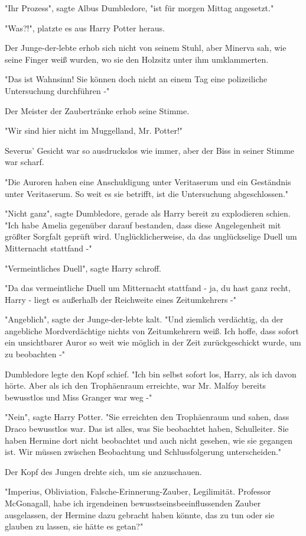{"Ihr Prozess", sagte Albus Dumbledore, "ist für morgen Mittag angesetzt."

"Was?!", platzte es aus Harry Potter heraus.

Der Junge-der-lebte erhob sich nicht von seinem Stuhl, aber Minerva sah, wie seine Finger weiß wurden, wo sie den Holzsitz unter ihm umklammerten.

"Das ist Wahnsinn! Sie können doch nicht an einem Tag eine polizeiliche Untersuchung durchführen -"

Der Meister der Zaubertränke erhob seine Stimme.

"Wir sind hier nicht im Muggelland, Mr. Potter!"

Severus' Gesicht war so ausdruckslos wie immer, aber der Biss in seiner Stimme war scharf.

"Die Auroren haben eine Anschuldigung unter Veritaserum und ein Geständnis unter Veritaserum. So weit es sie betrifft, ist die Untersuchung abgeschlossen."

"Nicht ganz", sagte Dumbledore, gerade als Harry bereit zu explodieren schien. "Ich habe Amelia gegenüber darauf bestanden, dass diese Angelegenheit mit größter Sorgfalt geprüft wird. Unglücklicherweise, da das unglückselige Duell um Mitternacht stattfand -"

"Vermeintliches Duell", sagte Harry schroff.

"Da das vermeintliche Duell um Mitternacht stattfand - ja, du hast ganz recht, Harry - liegt es außerhalb der Reichweite eines Zeitumkehrers -"

"Angeblich", sagte der Junge-der-lebte kalt. "Und ziemlich verdächtig, da der angebliche Mordverdächtige nichts von Zeitumkehrern weiß. Ich hoffe, dass sofort ein unsichtbarer Auror so weit wie möglich in der Zeit zurückgeschickt wurde, um zu beobachten -"

Dumbledore legte den Kopf schief. "Ich bin selbst sofort los, Harry, als ich davon hörte. Aber als ich den Trophäenraum erreichte, war Mr. Malfoy bereits bewusstlos und Miss Granger war weg -"

"Nein", sagte Harry Potter. "Sie erreichten den Trophäenraum und sahen, dass Draco bewusstlos war. Das ist alles, was Sie beobachtet haben, Schulleiter. Sie haben Hermine dort nicht beobachtet und auch nicht gesehen, wie sie gegangen ist. Wir müssen zwischen Beobachtung und Schlussfolgerung unterscheiden."

Der Kopf des Jungen drehte sich, um sie anzuschauen.

"Imperius, Obliviation, Falsche-Erinnerung-Zauber, Legilimität. Professor McGonagall, habe ich irgendeinen bewusstseinsbeeinflussenden Zauber ausgelassen, der Hermine dazu gebracht haben könnte, das zu tun oder sie glauben zu lassen, sie hätte es getan?"

}
